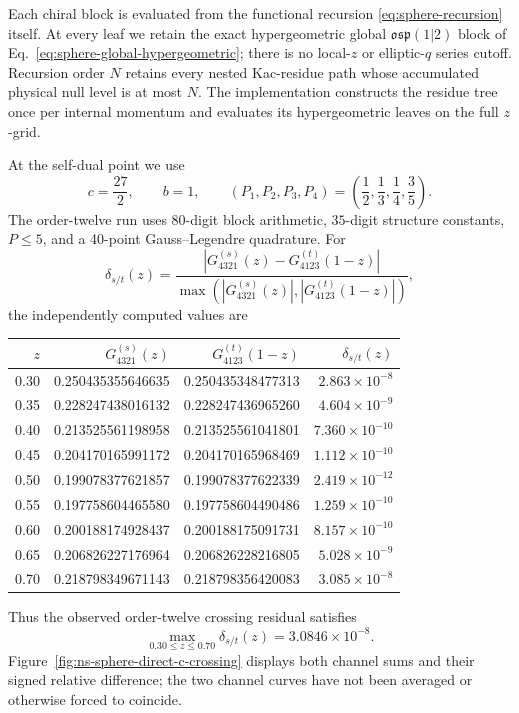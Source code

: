 \documentclass[11pt]{article}
\newcommand{\osp}{\mathfrak{osp}(1|2)}
\begin{document}
Each chiral block is evaluated from the functional recursion
\eqref{eq:sphere-recursion} itself.  At every leaf we retain the exact
hypergeometric global \(\osp\) block of
Eq.~\eqref{eq:sphere-global-hypergeometric}; there is no local-\(z\) or
elliptic-\(q\) series cutoff.  Recursion order \(N\) retains every nested
Kac-residue path whose accumulated physical null level is at most \(N\).
The implementation constructs the residue tree once per internal momentum
and evaluates its hypergeometric leaves on the full \(z\)-grid.

At the self-dual point we use
\begin{equation}
 c=\frac{27}{2},\qquad b=1,\qquad
 (P_1,P_2,P_3,P_4)
 =\left(\frac12,\frac13,\frac14,\frac35\right).
 \label{eq:ns-crossing-numerical-point}
\end{equation}
The order-twelve run uses \(80\)-digit block arithmetic, \(35\)-digit
structure constants, \(P\leq5\), and a 40-point Gauss--Legendre quadrature.
For
\begin{equation}
 \delta_{s/t}(z)=
 \frac{\left|G_{4321}^{(s)}(z)-G_{4123}^{(t)}(1-z)\right|}
 {\max\!\left(\left|G_{4321}^{(s)}(z)\right|,
              \left|G_{4123}^{(t)}(1-z)\right|\right)},
 \label{eq:ns-crossing-relative-residual}
\end{equation}
the independently computed values are
\begin{center}
\scriptsize
\begin{tabular}{@{}rrrr@{}}
\toprule
\(z\) & \(G_{4321}^{(s)}(z)\) & \(G_{4123}^{(t)}(1-z)\)
      & \(\delta_{s/t}(z)\)\\
\midrule
0.30 & 0.250435355646635 & 0.250435348477313 & \(2.863\times10^{-8}\)\\
0.35 & 0.228247438016132 & 0.228247436965260 & \(4.604\times10^{-9}\)\\
0.40 & 0.213525561198958 & 0.213525561041801 & \(7.360\times10^{-10}\)\\
0.45 & 0.204170165991172 & 0.204170165968469 & \(1.112\times10^{-10}\)\\
0.50 & 0.199078377621857 & 0.199078377622339 & \(2.419\times10^{-12}\)\\
0.55 & 0.197758604465580 & 0.197758604490486 & \(1.259\times10^{-10}\)\\
0.60 & 0.200188174928437 & 0.200188175091731 & \(8.157\times10^{-10}\)\\
0.65 & 0.206826227176964 & 0.206826228216805 & \(5.028\times10^{-9}\)\\
0.70 & 0.218798349671143 & 0.218798356420083 & \(3.085\times10^{-8}\)\\
\bottomrule
\end{tabular}
\end{center}
Thus the observed order-twelve crossing residual satisfies
\begin{equation}
 \max_{0.30\leq z\leq0.70}\delta_{s/t}(z)
 =3.0846\times10^{-8}.
 \label{eq:ns-crossing-order12-result}
\end{equation}
Figure~\ref{fig:ns-sphere-direct-c-crossing} displays both channel sums and
their signed relative difference; the two channel curves have not been
averaged or otherwise forced to coincide.
\end{document}
